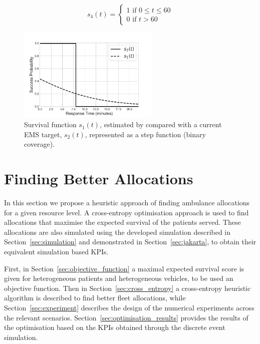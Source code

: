 \documentclass[preprint,12pt]{elsarticle}
\begin{document}
\begin{equation}\label{eqn:survival_cutoff_60}
    s_4(t) = \begin{cases} 
    1 \text{ if } 0\leq t \leq 60 \\
    0 \text{ if } t > 60 
    \end{cases}
\end{equation}

\begin{figure}[ht]
\centering
  \includegraphics[width=0.6\textwidth]{img/Survival_Function_(new).pdf}
    \caption{Survival function $s_1(t)$, estimated by \cite{Valenzuela20001206} compared with a current EMS target, $s_2(t)$, represented as a step function (binary coverage).}
  \label{fig:survivalfunction}
\end{figure}



\section{Finding Better Allocations}\label{sec:betterallocations}
In this section we propose a heuristic approach of finding ambulance allocations for a given resource level. A cross-entropy optimisation approach is used to find allocations that maximise the expected survival of the patients served. These allocations are also simulated using the developed simulation  described in Section~\ref{sec:simulation} and demonstrated in Section~\ref{sec:jakarta}, to obtain their equivalent simulation based KPIs.

First, in Section~\ref{sec:objective_function} a maximal expected survival score is given for heterogeneous patients and heterogeneous vehicles, to be used an objective function. Then in Section~\ref{sec:cross_entropy} a cross-entropy heuristic algorithm is described to find better fleet allocations, while Section~\ref{sec:experiment} describes the design of the numerical experiments across the relevant scenarios. Section~\ref{sec:optimisation_results} provides the results of the optimisation based on the KPIs obtained through the discrete event simulation.
\end{document}
